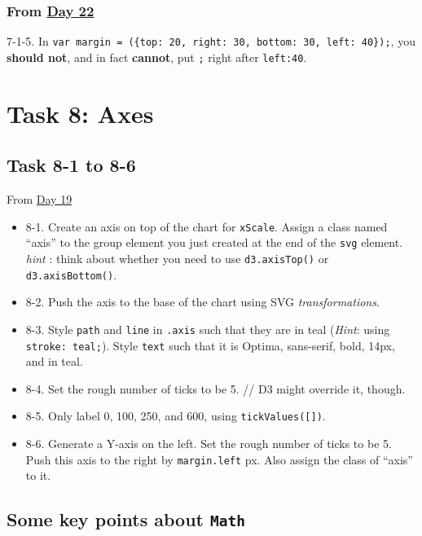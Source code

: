 \documentclass[
]{book}
\begin{document}
\hypertarget{from-day-22}{%
\subsection{\texorpdfstring{From \href{https://observablehq.com/@hongtaoh/day-twenty-two-spet-15th-2020}{Day 22}}{From Day 22}}\label{from-day-22}}

7-1-5. In \texttt{var\ margin\ =\ (\{top:\ 20,\ right:\ 30,\ bottom:\ 30,\ left:\ 40\});}, you \textbf{should not}, and in fact \textbf{cannot}, put \texttt{;} right after \texttt{left:40}.

\hypertarget{task8}{%
\chapter{Task 8: Axes}\label{task8}}

\hypertarget{task-8-1-to-8-6}{%
\section{Task 8-1 to 8-6}\label{task-8-1-to-8-6}}

From \href{https://observablehq.com/@hongtaoh/day-nineteen-spet-12-2020}{Day 19}

\begin{itemize}
\item
  8-1. Create an axis on top of the chart for \texttt{xScale}. Assign a class named ``axis'' to the group element you just created at the end of the \texttt{svg} element. \emph{hint} : think about whether you need to use \texttt{d3.axisTop()} or \texttt{d3.axisBottom()}.
\item
  8-2. Push the axis to the base of the chart using SVG \emph{transformations}.
\item
  8-3. Style \texttt{path} and \texttt{line} in \texttt{.axis} such that they are in teal (\emph{Hint}: using \texttt{stroke:\ teal;}). Style \texttt{text} such that it is Optima, sans-serif, bold, 14px, and in teal.
\item
  8-4. Set the rough number of ticks to be 5. // D3 might override it, though.
\item
  8-5. Only label 0, 100, 250, and 600, using \texttt{tickValues({[}{]})}.
\item
  8-6. Generate a Y-axis on the left. Set the rough number of ticks to be 5. Push this axis to the right by \texttt{margin.left} px. Also assign the class of ``axis'' to it.
\end{itemize}

\hypertarget{some-key-points-about-math}{%
\section{\texorpdfstring{Some key points about \texttt{Math}}{Some key points about Math}}\label{some-key-points-about-math}}
\end{document}
